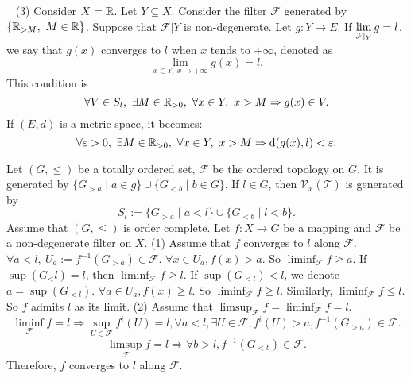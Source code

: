 \begin{exampleenv}
    \ \newline
    (3) Consider $X=\mathbb{R}$. Let $Y\subseteq X$. Consider the filter $\mathcal{F}$ generated by $\{\mathbb{R}_{>M},\ M\in \mathbb{R}\}$. Suppose that $\mathcal{F}|Y$ is non-degenerate. Let $g:Y\longrightarrow E$. If $\displaystyle \lim_{\mathcal{F}|_Y}g=l$, we say that $g(x)$ converges to $l$ when $x$ tends to $+\infty$, denoted as $$\lim_{x\in Y,\ x\rightarrow+\infty}g(x)=l.$$
     This condition is
    $$\forall V\in S_l,\ \exists M\in \RR_{>0},\ \forall x\in Y,\ x>M\Rightarrow g(x)\in V.$$
    If $(E,d)$ is a metric space, it becomes:
    $$\forall \varepsilon >0,\ \exists M\in \RR_{>0},\ \forall x\in Y,\ x>M\Rightarrow \mathrm{d}(g(x),l)<\varepsilon.$$
\end{exampleenv}
\begin{exampleenv}
    Let $(G,\le)$ be a totally ordered set, $\mathcal{F}$ be the ordered topology on $G$. It is generated by $\{G_{>a}\mid a\in g\}\cup\{G_{<b}\mid b\in G\}$. If $l\in G$, then $\mathcal{V}_x(\mathscr{T})$ is generated by 
    $$S_l:=\{G_{>a}\mid a<l\}\cup\{G_{<b}\mid l<b\}.$$
    Assume that $(G,\le)$ is order complete. Let $f:X\longrightarrow G$ be a mapping and $\mathcal{F}$  be  a non-degenerate filter on $X$.
    \newline
    (1) Assume that $f$ converges to $l$ along $\mathcal{F}$. $\forall a< l, \ U_a:=f^{-1}\left(G_{>a}\right)\in \mathcal{F}$. $\forall x\in U_a, f(x)>a$. So $\liminf_{\mathcal{F}}f\ge a$. If $\sup\left(G_<l\right)=l$, then $\liminf_{\mathcal{F}}f\ge l.$ If $\sup\left(G_{<l}\right)<l$, we denote $a=\sup\left(G_{<l}\right)$. $\forall a\in U_a, f(x)\ge l$. So $\liminf_{\mathcal{F}}f\ge l$. Similarly, $\liminf_{\mathcal{F}}f\le l$. So $f$ admits $l$ as its limit.
    \newline
    (2) Assume that $\limsup_{\mathcal{F}}f=\liminf_{\mathcal{F}}f=l$. 
    $$\liminf_{\mathcal{F}}f=l\Rightarrow \sup_{U\in \mathcal{F}}f^i(U)=l, \forall a<l, \exists U\in \mathcal{F}, f^i(U)>a, f^{-1}(G_{>a})\in \mathcal{F}.$$
    $$\limsup_{\mathcal{F}}f=l\Rightarrow \forall b>l, f^{-1}(G_{<b})\in \mathcal{F}.$$
    Therefore, $f$ converges to $l$ along $\mathcal{F}$.
\end{exampleenv}


